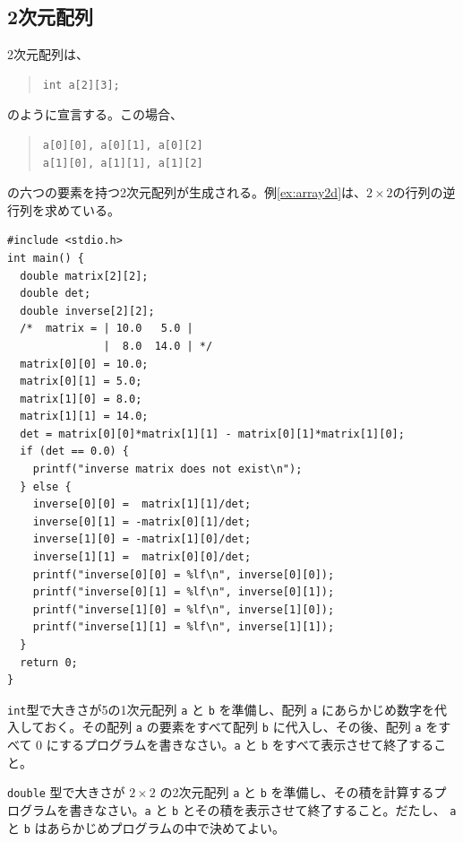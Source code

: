 \subsection{2次元配列}
2次元配列は、
\begin{quote}
\begin{verbatim}
int a[2][3];
\end{verbatim}
\end{quote}
のように宣言する。この場合、
\begin{quote}
\begin{verbatim}
a[0][0], a[0][1], a[0][2]
a[1][0], a[1][1], a[1][2]
\end{verbatim}
\end{quote}
の六つの要素を持つ2次元配列が生成される。例\ref{ex:array2d}は、$2 \times 2$の行列の逆行列を求めている。
\begin{reidai}\label{ex:array2d}
\begin{verbatim}
#include <stdio.h>
int main() {
  double matrix[2][2];
  double det;
  double inverse[2][2];
  /*  matrix = | 10.0   5.0 |
               |  8.0  14.0 | */
  matrix[0][0] = 10.0;
  matrix[0][1] = 5.0;
  matrix[1][0] = 8.0;
  matrix[1][1] = 14.0;
  det = matrix[0][0]*matrix[1][1] - matrix[0][1]*matrix[1][0];
  if (det == 0.0) {
    printf("inverse matrix does not exist\n");
  } else {
    inverse[0][0] =  matrix[1][1]/det;
    inverse[0][1] = -matrix[0][1]/det;
    inverse[1][0] = -matrix[1][0]/det;
    inverse[1][1] =  matrix[0][0]/det;
    printf("inverse[0][0] = %lf\n", inverse[0][0]);
    printf("inverse[0][1] = %lf\n", inverse[0][1]);
    printf("inverse[1][0] = %lf\n", inverse[1][0]);
    printf("inverse[1][1] = %lf\n", inverse[1][1]);
  }
  return 0;
}
\end{verbatim}
\end{reidai}

\begin{renshuu}\label{prob:3-1}
\verb|int|型で大きさが5の1次元配列 \verb|a| と \verb|b| を準備し、配列 \verb|a| にあらかじめ数字を代入しておく。その配列 \verb|a| の要素をすべて配列 \verb|b| に代入し、その後、配列 \verb|a| をすべて 0 にするプログラムを書きなさい。\verb|a| と \verb|b| をすべて表示させて終了すること。
\end{renshuu}

\begin{renshuu}\label{prob:3-2}
\verb|double| 型で大きさが $2\times2$ の2次元配列 \verb|a| と \verb|b| を準備し、その積を計算するプログラムを書きなさい。\verb|a| と \verb|b| とその積を表示させて終了すること。だたし、 \verb|a| と \verb|b| はあらかじめプログラムの中で決めてよい。
\end{renshuu}

